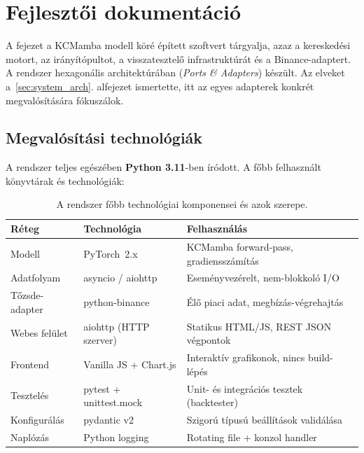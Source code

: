 \chapter{Fejlesztői dokumentáció}
\label{ch:implementacio}

A fejezet a KCMamba modell köré épített szoftvert tárgyalja,
azaz a kereskedési motort, az irányítópultot, a visszatesztelő infrastruktúrát
és a Binance-adaptert. A rendszer hexagonális architektúrában (\emph{Ports \& Adapters})
készült. Az elveket a~\ref{sec:system_arch}. alfejezet ismertette,
itt az egyes adapterek konkrét megvalósítására fókuszálok.

\section{Megvalósítási technológiák}
\label{sec:impl_tech}

A rendszer teljes egészében \textbf{Python 3.11}-ben íródott.
A főbb felhasznált könyvtárak és technológiák:

\begin{table}[H]
  \centering
  \small
  \begin{tabular}{|l|l|p{7cm}|}
    \hline
    \textbf{Réteg} & \textbf{Technológia} & \textbf{Felhasználás} \\
    \hline\hline
    Modell         & PyTorch~2.x          & KCMamba forward-pass, gradiensszámítás \\
    Adatfolyam     & asyncio / aiohttp    & Eseményvezérelt, nem-blokkoló I/O \\
    Tőzsde-adapter & python-binance       & Élő piaci adat, megbízás-végrehajtás \\
    Webes felület  & aiohttp (HTTP szerver) & Statikus HTML/JS, REST JSON végpontok \\
    Frontend       & Vanilla JS + Chart.js & Interaktív grafikonok, nincs build-lépés \\
    Tesztelés      & pytest + unittest.mock & Unit- és integrációs tesztek (backtester) \\
    Konfigurálás   & pydantic v2          & Szigorú típusú beállítások validálása \\
    Naplózás       & Python logging       & Rotating file + konzol handler \\
    \hline
  \end{tabular}
  \caption{A rendszer főbb technológiai komponensei és azok szerepe.}
  \label{tab:tech_stack}
\end{table}

